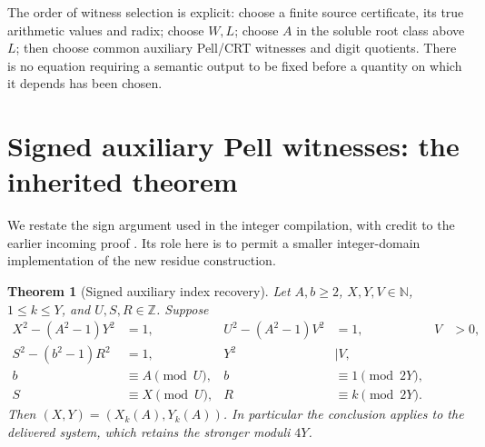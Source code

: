 \documentclass[10pt,letterpaper]{article}
\newtheorem{theorem}{Theorem}[section]
\theoremstyle{remark}\newtheorem{remark}[theorem]{Remark}
\newcommand{\N}{\mathbb N}\newcommand{\Z}{\mathbb Z}
\begin{document}
The order of witness selection is explicit: choose a finite source
certificate, its true arithmetic values and radix; choose $W,L$;
choose $A$ in the soluble root class above $L$; then choose common
auxiliary Pell/CRT witnesses and digit quotients. There is no equation
requiring a semantic output to be fixed before a quantity on which it
depends has been chosen.

\section{Signed auxiliary Pell witnesses: the inherited theorem}
\label{sec:signed}

We restate the sign argument used in the integer compilation, with
credit to the earlier incoming proof \cite{signed}. Its role here is
to permit a smaller integer-domain implementation of the new residue
construction.

\begin{theorem}[Signed auxiliary index recovery]\label{thm:signed}
Let $A,b\ge2$, $X,Y,V\in\N$, $1\le k\le Y$, and $U,S,R\in\Z$.
Suppose
\begin{align*}
 X^2-(A^2-1)Y^2&=1,& U^2-(A^2-1)V^2&=1,& V&>0,\\
 S^2-(b^2-1)R^2&=1,&Y^2&\mid V,\\
 b&\equiv A\pmod U,& b&\equiv1\pmod{2Y},\\
 S&\equiv X\pmod U,&R&\equiv k\pmod{2Y}.
\end{align*}
Then $(X,Y)=(X_k(A),Y_k(A))$. In particular the conclusion applies
to the delivered system, which retains the stronger moduli $4Y$.
\end{theorem}
\end{document}
